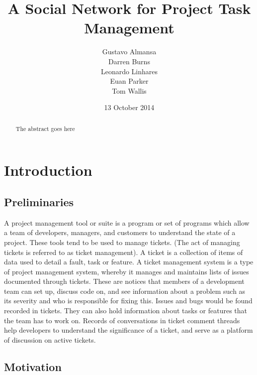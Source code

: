 \documentclass[a4paper]{l3proj}
\begin{document}
\title{A Social Network for Project Task Management}
\author{Gustavo Almansa\\
      Darren Burns \\
      Leonardo Linhares \\
      Euan Parker \\
		    Tom Wallis \\
}
\date{13 October 2014}
\maketitle
\begin{abstract}

The abstract goes here

\end{abstract}
\educationalconsent
\tableofcontents
\chapter{Introduction}
\label{intro}

\section{Preliminaries}
\label{preliminaries}
A project management tool or suite is a program or set of programs which allow a team of developers, managers, and customers to understand the state of a project. These tools tend to be used to manage tickets. (The act of managing tickets is referred to as ticket management). A ticket is a collection of items of data used to detail a fault, task or feature.  A ticket management system is a type of project management system, whereby it manages and maintains lists of issues documented through tickets. These are notices that members of a development team can set up, discuss code on, and see information about a problem such as its severity and who is responsible for fixing this. Issues and bugs would be found recorded in tickets. They can also hold information about tasks or features that the team has to work on. Records of conversations in ticket comment threads help developers to understand the significance of a ticket, and serve as a platform of discussion on active tickets.


\section{Motivation}
\label{motivation}
\end{document}
